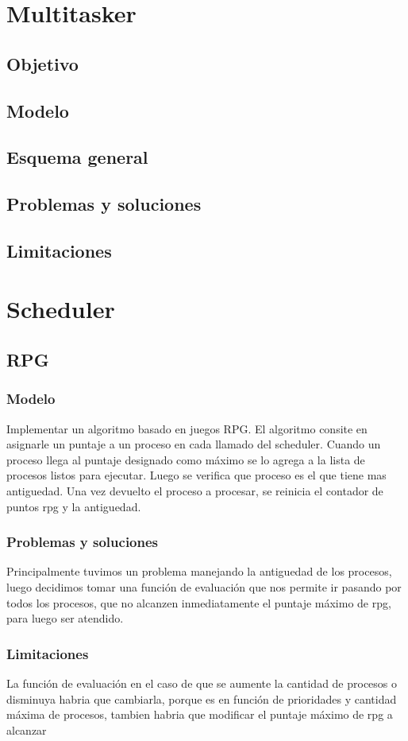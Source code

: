 \documentclass[10pt,a4paper]{article}
\begin{document}
\section{Multitasker}
	\subsection{Objetivo}
	\subsection{Modelo}
	\subsection{Esquema general}
	\subsection{Problemas y soluciones}
	\subsection{Limitaciones}

\section{Scheduler}
	\subsection{RPG}
	\subsubsection{Modelo}
		Implementar un algoritmo basado en juegos RPG. El algoritmo consite en asignarle un puntaje a un proceso en cada llamado del scheduler. Cuando un proceso llega al puntaje designado como m\'aximo se lo agrega a la lista de procesos listos para ejecutar. Luego se verifica que proceso es el que tiene mas antiguedad. Una vez devuelto el proceso a procesar, se reinicia el contador de puntos rpg y la antiguedad.
	\subsubsection{Problemas y soluciones}
		Principalmente tuvimos un problema manejando la antiguedad de los procesos, luego decidimos tomar una funci\'on de evaluaci\'on que nos permite ir pasando por todos los procesos, que no alcanzen inmediatamente el puntaje m\'aximo de rpg, para luego ser atendido.
	\subsubsection{Limitaciones}
		La funci\'on de evaluaci\'on en el caso de que se aumente la cantidad de procesos o disminuya habria que cambiarla, porque es en funci\'on de prioridades y cantidad m\'axima de procesos, tambien habria que modificar el puntaje m\'aximo de rpg a alcanzar
\end{document}
